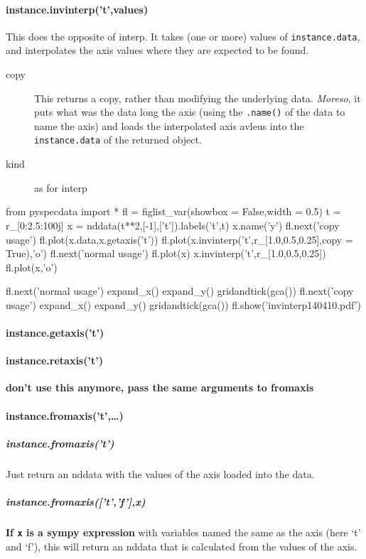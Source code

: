 \paragraph{instance.invinterp('t',values)}
This does the opposite of interp.
It takes (one or more) values of
    \texttt{instance.data}, and
    interpolates the axis values where
    they are expected to be found.
\begin{mykwargs}
    \begin{description}
        \item[copy] This returns a copy, rather than modifying the underlying data.
            \textit{Moreso}, it puts what was the data long the axis (using the \texttt{.name()} of the data to name the axis) and loads the interpolated axis avleus into the \texttt{instance.data} of the returned object.
        \item[kind] as for interp
    \end{description}
\end{mykwargs}

\begin{python}
from pyspecdata import *
fl = figlist_var(showbox = False,width = 0.5)
t = r_[0:2.5:100j]
x = nddata(t**2,[-1],['t']).labels('t',t)
x.name('y')
fl.next('copy usage')
fl.plot(x.data,x.getaxis('t'))
fl.plot(x.invinterp('t',r_[1.0,0.5,0.25],copy = True),'o')
fl.next('normal usage')
fl.plot(x)
x.invinterp('t',r_[1.0,0.5,0.25])
fl.plot(x,'o')

fl.next('normal usage')
expand_x()
expand_y()
gridandtick(gca())
fl.next('copy usage')
expand_x()
expand_y()
gridandtick(gca())
fl.show('invinterp140410.pdf')
\end{python}

\paragraph{instance.getaxis('t')}
\paragraph{instance.retaxis('t')}
\textbf{don't use this anymore, pass the same arguments to fromaxis}
\paragraph{instance.fromaxis('t',\ldots)}
\subparagraph{instance.fromaxis('t')}
Just return an nddata with the values of the axis loaded into the data.
\subparagraph{instance.fromaxis(['t','f'],x)}
\textbf{If \texttt{x} is a sympy expression} with variables named the same as the axis (here `t' and `f'), this will return an nddata that is calculated from the values of the axis.


